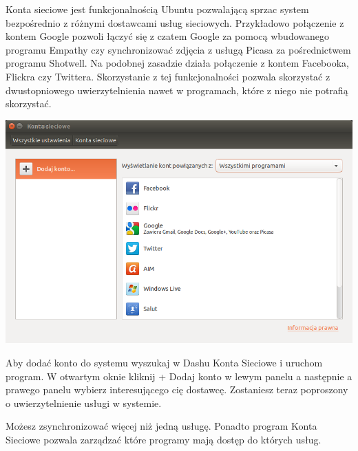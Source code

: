 \textcolor{ubuntu_orange}{Konta sieciowe} jest funkcjonalnością Ubuntu pozwalającą sprzac system bezpośrednio z różnymi dostawcami usług sieciowych. Przykładowo połączenie z kontem Google pozwoli łączyć się z czatem Google za pomocą wbudowanego programu Empathy czy synchronizować zdjęcia z usługą Picasa za pośrednictwem programu Shotwell. Na podobnej zasadzie działa połączenie z kontem Facebooka, Flickra czy Twittera. Skorzystanie z tej funkcjonalności pozwala skorzystać z dwustopniowego uwierzytelnienia nawet w programach, które z niego nie potrafią skorzystać.

\begin{center}
	\includegraphics[width=\linewidth]{images/programy_kontaOnline1.png}
\end{center}

Aby dodać konto do systemu wyszukaj w Dashu \textcolor{ubuntu_orange}{Konta Sieciowe} i uruchom program. W otwartym oknie kliknij \textcolor{ubuntu_orange}{+ Dodaj konto} w lewym panelu a następnie a prawego panelu wybierz interesującego cię dostawcę. Zostaniesz teraz poproszony o uwierzytelnienie usługi w systemie.

Możesz zsynchronizować więcej niż jedną usługę. Ponadto program Konta Sieciowe pozwala zarządzać które programy mają dostęp do których usług. 